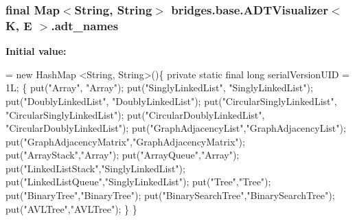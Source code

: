 \subsubsection[{adt\+\_\+names}]{\setlength{\rightskip}{0pt plus 5cm}final Map$<$String, String$>$ {\bf bridges.\+base.\+A\+D\+T\+Visualizer}$<$ K, E $>$.adt\+\_\+names}\label{classbridges_1_1base_1_1_a_d_t_visualizer_a6646d020143637569d607fa109c71ff9}
{\bfseries Initial value\+:}
\begin{DoxyCode}
=
            \textcolor{keyword}{new} HashMap <String, String>()\{
                \textcolor{keyword}{private} \textcolor{keyword}{static} \textcolor{keyword}{final} \textcolor{keywordtype}{long} serialVersionUID = 1L;
                \{
                    put(\textcolor{stringliteral}{"Array"}, \textcolor{stringliteral}{"Array"});
                    put(\textcolor{stringliteral}{"SinglyLinkedList"}, \textcolor{stringliteral}{"SinglyLinkedList"});
                    put(\textcolor{stringliteral}{"DoublyLinkedList"}, \textcolor{stringliteral}{"DoublyLinkedList"});
                    put(\textcolor{stringliteral}{"CircularSinglyLinkedList"}, \textcolor{stringliteral}{"CircularSinglyLinkedList"});
                    put(\textcolor{stringliteral}{"CircularDoublyLinkedList"}, \textcolor{stringliteral}{"CircularDoublyLinkedList"});
                    put(\textcolor{stringliteral}{"GraphAdjacencyList"},\textcolor{stringliteral}{"GraphAdjacencyList"});
                    put(\textcolor{stringliteral}{"GraphAdjacencyMatrix"},\textcolor{stringliteral}{"GraphAdjacencyMatrix"});
                    put(\textcolor{stringliteral}{"ArrayStack"},\textcolor{stringliteral}{"Array"});
                    put(\textcolor{stringliteral}{"ArrayQueue"},\textcolor{stringliteral}{"Array"});
                    put(\textcolor{stringliteral}{"LinkedListStack"},\textcolor{stringliteral}{"SinglyLinkedList"});
                    put(\textcolor{stringliteral}{"LinkedListQueue"},\textcolor{stringliteral}{"SinglyLinkedList"});
                    put(\textcolor{stringliteral}{"Tree"},\textcolor{stringliteral}{"Tree"});
                    put(\textcolor{stringliteral}{"BinaryTree"},\textcolor{stringliteral}{"BinaryTree"});
                    put(\textcolor{stringliteral}{"BinarySearchTree"},\textcolor{stringliteral}{"BinarySearchTree"});
                    put(\textcolor{stringliteral}{"AVLTree"},\textcolor{stringliteral}{"AVLTree"});
                \}
            \}
\end{DoxyCode}
\hypertarget{classbridges_1_1base_1_1_a_d_t_visualizer_a6304c4131e3e7eb5953402368b0e9e3c}{}
